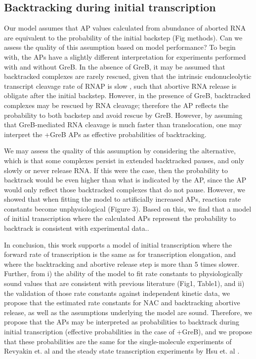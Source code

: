 \subsection{Backtracking during initial transcription}
Our model assumes that AP values calculated from abundance of aborted RNA are
equivalent to the probability of the initial backstep (Fig methods).
Can we assess the quality of this assumption based on model performance? To
begin with, the APs have a slightly different interpretation for experiments
performed with and without GreB. In the absence of GreB, it may be assumed
that backtracked complexes are rarely rescued, given that the intrinsic
endonucleolytic transcript cleavage rate of RNAP is slow
\cite{laptenko_transcript_2003}, such that abortive RNA release is obligate
after the initial backstep. However, in the presence of GreB, backtracked
complexes may be rescued by RNA cleavage; therefore the AP reflects the
probability to both backstep and avoid rescue by GreB. However, by assuming
that GreB-mediated RNA cleavage is much faster than translocation, one may
interpret the +GreB APs as effective probabilities of backtracking.

We may assess the quality of this assumption by considering the alternative,
which is that some complexes persist in extended backtracked pauses, and only
slowly or never release RNA. If this were the case, then the probability to
backtrack would be even higher than what is indicated by the AP, since the AP
would only reflect those backtracked complexes that do not pause. However, we
showed that when fitting the model to artificially increased APs, reaction
rate constants become unphysiological (Figure 3). Based on this, we find that
a model of initial transcription where the calculated APs represent the
probability to backtrack is consistent with experimental data..

In conclusion, this work supports a model of initial transcription where the
forward rate of transcription is the same as for transcription elongation, and
where the backtracking and abortive release step is more than 5 times slower.
Further, from i) the ability of the model to fit rate
constants to physiologically sound values that are consistent with previous
literature (Fig1, Table1), and ii) the validation of those rate constants
against independent kinetic data, we propose that the estimated rate constants
for NAC and backtracking abortive release, as well as the assumptions
underlying the model are sound. Therefore, we propose that the APs may be
interpreted as probabilities to backtrack during initial transcription
(effective probabilities in the case of +GreB), and we propose that these
probabilities are the same for the single-molecule experiments of Revyakin
et. al \cite{revyakin_abortive_2006} and the steady state transcription
experiments by Hsu et. al \cite{hsu_initial_2006}.


